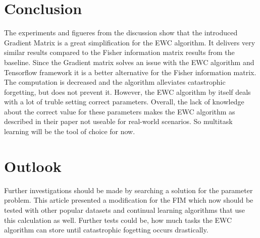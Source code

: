 \section{Conclusion}

The experiments and figueres from the discussion show that the introduced Gradient Matrix is a great simplification for the EWC algorithm.
It delivers very similar results compared to the Fisher information matrix results from the baseline.
Since the Gradient matrix solves an issue with the EWC algorithm and Tensorflow framework it is a better alternative for the Fisher information matrix.
The computation is decreased and the algorithm alleviates catastrophic forgetting, but does not prevent it.
However, the EWC algorithm by itself deals with a lot of truble setting correct parameters.
Overall, the lack of knowledge about the correct value for these parameters makes the EWC algorithm as described in their paper not useable for real-world scenarios.
So multitask learning will be the tool of choice for now.

\section{Outlook}

Further investigations should be made by searching a solution for the parameter problem.
This article presented a modification for the FIM which now should be tested with other popular datasets and continual learning algorithms that use this calculation as well.
Further tests could be, how much tasks the EWC algorithm can store until catastrophic fogetting occurs drastically.

